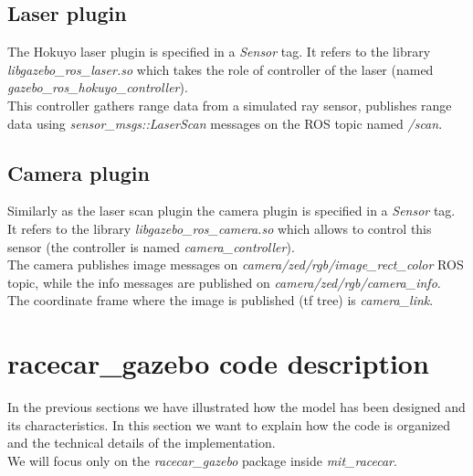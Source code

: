 \subsection{Laser plugin}
The Hokuyo laser plugin is specified in a \textit{Sensor} tag. It refers to the library 
\textit{libgazebo\_ros\_laser.so} which takes the role of controller of the laser 
(named \textit{gazebo\_ros\_hokuyo\_controller}).\\
This controller gathers range data from a simulated ray sensor, publishes range data using 
\textit{sensor\_msgs::LaserScan} messages on the ROS topic named \textit{/scan}.

\subsection{Camera plugin}
Similarly as the laser scan plugin the camera plugin is specified in a \textit{Sensor} tag. It refers
to the library \textit{libgazebo\_ros\_camera.so} which allows to control this sensor (the controller
is named \textit{camera\_controller}).\\
The camera publishes image messages on \textit{camera/zed/rgb/image\_rect\_color} ROS topic, while the
info messages are published on \textit{camera/zed/rgb/camera\_info}.\\
The coordinate frame where the image is published (tf tree) is \textit{camera\_link}.

\section{racecar\_gazebo code description}
In the previous sections we have illustrated how the model has been designed and its characteristics. In this
section we want to explain how the code is organized and the technical details of the implementation.\\
We will focus only on the \textit{racecar\_gazebo} package inside \textit{mit\_racecar}.

